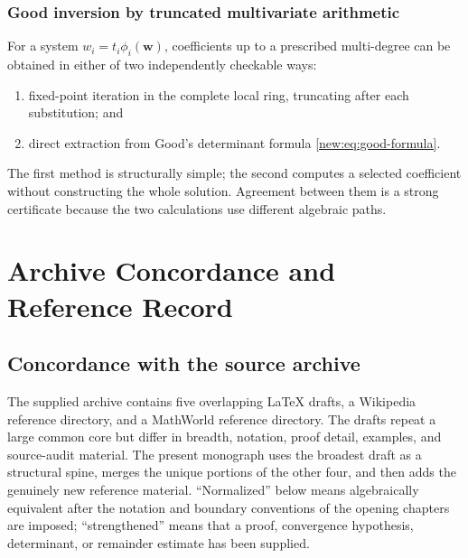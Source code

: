 \documentclass[11pt,a4paper,oneside,openany]{book}
\theoremstyle{definition}
\theoremstyle{remark}
\begin{document}
\section{Good inversion by truncated multivariate arithmetic}

For a system $w_i=t_i\phi_i(\boldsymbol w)$, coefficients up to a prescribed
multi-degree can be obtained in either of two independently checkable ways:

\begin{enumerate}
\item fixed-point iteration in the complete local ring, truncating after each
      substitution; and
\item direct extraction from Good's determinant formula
      \eqref{new:eq:good-formula}.
\end{enumerate}

The first method is structurally simple; the second computes a selected
coefficient without constructing the whole solution.  Agreement between them
is a strong certificate because the two calculations use different algebraic
paths.

\part{Archive Concordance and Reference Record}

\chapter{Concordance with the source archive}
\label{ch:concordance}

The supplied archive contains five overlapping LaTeX drafts, a Wikipedia reference
directory, and a MathWorld reference directory.  The drafts repeat a large common
core but differ in breadth, notation, proof detail, examples, and source-audit
material.  The present monograph uses the broadest draft as a structural spine,
merges the unique portions of the other four, and then adds the genuinely new
reference material.  ``Normalized'' below means algebraically equivalent after the
notation and boundary conventions of the opening chapters are imposed;
``strengthened'' means that a proof, convergence hypothesis, determinant, or
remainder estimate has been supplied.
\end{document}
